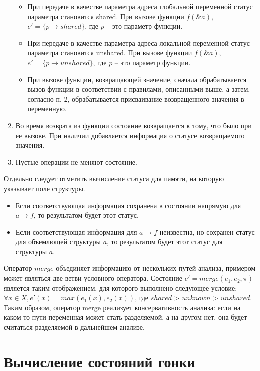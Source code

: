 \begin{enumerate}
\begin{itemize}
\item При передаче в качестве параметра адреса глобальной переменной статус параметра становится shared.
При вызове функции $f(\&a)$, $e' = \{p \to shared\}$, где $p$ -- это параметр функции.

\item При передаче в качестве параметра адреса локальной переменной статус параметра становится unshared.
При вызове функции $f(\&a)$, $e' = \{p \to unshared\}$, где $p$ -- это параметр функции.

\item При вызове функции, возвращающей значение, сначала обрабатывается вызов функции в соответствии с правилами, описанными выше, а затем, согласно п. 2, обрабатывается присваивание возвращенного значения в переменную.

\end{itemize}

\item Во время возврата из функции состояние возвращается к тому, что было при ее вызове. 
При наличии добавляется информация о статусе возвращаемого значения.

\item Пустые операции не меняют состояние.
\end{enumerate}

Отдельно следует отметить вычисление статуса для памяти, на которую указывает поле структуры.
\begin{itemize}
\item Если соответствующая информация сохранена в состоянии напрямую для $a \rightarrow f$, то результатом будет этот статус.
\item Если соответствующая информация для $a \rightarrow f$ неизвестна, но сохранен статус для объемлющей структуры $a$, то результатом будет этот статус для структуры $a$.
\end{itemize}

Оператор $merge$ объединяет информацию от нескольких путей анализа, примером может являться две ветви условного оператора.
Состояние $e' = merge(e_1, e_2, \pi)$ является таким отображением, для которого выполнено следующее условие: $\forall x \in X, e'(x) = max(e_1(x), e_2(x))$, где $shared$ > $unknown$ > $unshared$.
Таким образом, оператор merge реализует консервативность анализа: если на каком-то пути переменная может стать разделяемой, а на другом нет, она будет считаться разделяемой в дальнейшем анализе.

\section{Вычисление состояний гонки}
\label{sect_impl_races}

